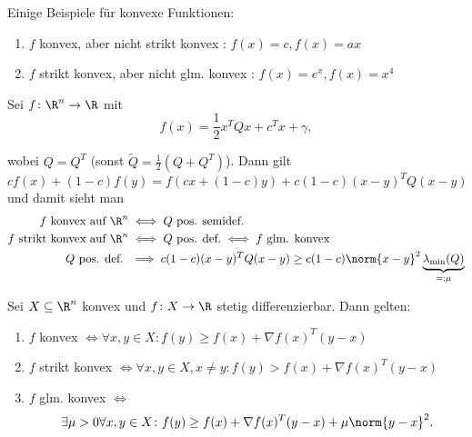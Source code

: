 \begin{beispiel}
\label{thm:bspkonvexfunktion1}

Einige Beispiele für konvexe Funktionen:
\begin{enumerate}[label=\alph{enumi})]
	\item $f$ konvex, aber nicht strikt konvex : $f(x)=c, f(x)=ax$
	\item $f$ strikt konvex, aber nicht glm. konvex : $f(x)=e^{x}, f(x)= x^{4}$
\end{enumerate}
\end{beispiel}

\begin{beispiel}
\label{thm:bspkonvexfunktion2}
Sei $f\colon \R^{n} \rightarrow \R$ mit 
\[
f(x) = \frac{1}{2}x^{T}Qx + c^{T}x+ \gamma
,\]

wobei $Q=Q^{T}$ (sonst $\tilde{Q}= \frac{1}{2}(Q+Q^{T})$). Dann gilt
\[
	cf(x)+(1-c)f(y) = f(cx+(1-c)y) + c(1-c)(x-y)^{T}Q(x-y)
\] 
und damit sieht man 
\begin{align*}
	f \text{ konvex auf } \R^{n} &\iff Q \text{ pos. semidef.} \\
	f \text{ strikt konvex auf } \R^{n} &\iff Q \text{ pos. def.} \iff f \text{ glm. konvex} \\
	Q \text{ pos. def. } &\implies c(1-c)(x-y)^{T}Q(x-y) \geq c(1-c)\norm{x-y} ^2 \underbrace{\lambda_{\min}(Q)}_{=:\mu} 
\end{align*}
\end{beispiel}

\begin{satz}
\label{thm:konvexcharakterisierung}
Sei $X \subseteq \R^{n}$ konvex und $f \colon X \rightarrow \R$ stetig differenzierbar. Dann gelten:
\begin{enumerate}[label=\alph{enumi})]
	\item $f$ konvex $\iff \forall x,y \in X \colon f(y) \geq f(x) + \nabla f(x)^{T}(y-x)$
	\item $f$ strikt konvex $\iff \forall x,y \in X, x \neq y \colon f(y) > f(x) + \nabla f(x)^{T}(y-x)$
	\item $f$ glm. konvex $\iff$ 
		\[
		\exists \mu > 0 \forall x,y \in X \colon f(y) \geq f(x) + \nabla f(x)^{T}(y-x) + \mu \norm{y-x} ^2
		.\]
\end{enumerate}
\end{satz}

